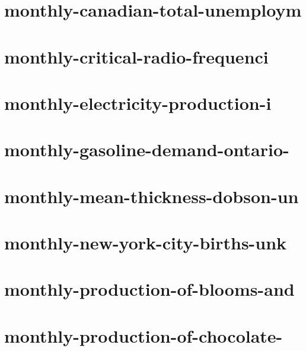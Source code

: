 \documentclass[twoside]{article}
\begin{document}
    

\section{monthly-canadian-total-unemploym}

    

\section{monthly-critical-radio-frequenci}

    

\section{monthly-electricity-production-i}

    

\section{monthly-gasoline-demand-ontario-}

    

\section{monthly-mean-thickness-dobson-un}

    

\section{monthly-new-york-city-births-unk}

    

\section{monthly-production-of-blooms-and}

    

\section{monthly-production-of-chocolate-}
\end{document}

